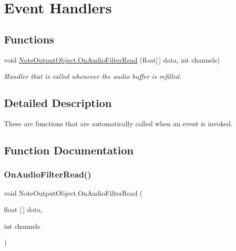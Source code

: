 \hypertarget{group___n_o_o_handlers}{}\section{Event Handlers}
\label{group___n_o_o_handlers}
\subsection*{Functions}
\begin{DoxyCompactItemize}
\item 
void \hyperlink{group___n_o_o_handlers_gaafd22f8a8c8d2cf101a54a4bf92782a5}{Note\+Output\+Object.\+On\+Audio\+Filter\+Read} (float\mbox{[}$\,$\mbox{]} data, int channels)
\begin{DoxyCompactList}\small\item\em Handler that is called whenever the audio buffer is refilled. \end{DoxyCompactList}\end{DoxyCompactItemize}


\subsection{Detailed Description}
These are functions that are automatically called when an event is invoked. 

\subsection{Function Documentation}
\mbox{\label{group___n_o_o_handlers_gaafd22f8a8c8d2cf101a54a4bf92782a5}} 
\subsubsection{\texorpdfstring{On\+Audio\+Filter\+Read()}{OnAudioFilterRead()}}
{\footnotesize\ttfamily void Note\+Output\+Object.\+On\+Audio\+Filter\+Read (\begin{DoxyParamCaption}\item[{float \mbox{[}$\,$\mbox{]}}]{data,  }\item[{int}]{channels }\end{DoxyParamCaption})\hspace{0.3cm}{\ttfamily [private]}}



